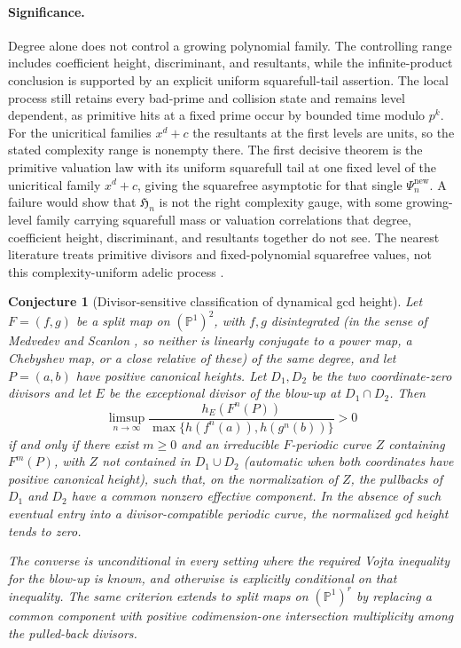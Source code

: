 \documentclass[11pt]{article}
\newtheorem{conjecture}{Conjecture}
\theoremstyle{definition}
\begin{document}
\paragraph{Significance.}
Degree alone does not control a growing polynomial family.  The controlling range includes
coefficient height, discriminant, and resultants, while the infinite-product conclusion
is supported by an explicit uniform squarefull-tail assertion.  The local process still
retains every bad-prime and collision state and remains level dependent, as primitive
hits at a fixed prime occur by bounded time modulo $p^k$.  For the unicritical families $x^d+c$ the resultants at the first levels are units, so the stated complexity range is nonempty there. The first decisive theorem is the primitive valuation law with its uniform squarefull tail at one fixed level of the unicritical family $x^d+c$, giving the squarefree asymptotic for that single $\Psi_n^{\mathrm{new}}$. A failure would show that $\mathfrak H_n$ is not the right complexity gauge, with some growing-level family carrying squarefull mass or valuation correlations that degree, coefficient height, discriminant, and resultants together do not see.  The nearest literature treats primitive divisors and fixed-polynomial squarefree values, not this complexity-uniform
adelic process \cite{Primitive,KrummDynatomic}.

\begin{conjecture}[Divisor-sensitive classification of dynamical gcd height]\label{s20}
Let $F=(f,g)$ be a split map on $(\mathbb P^1)^2$, with $f,g$ disintegrated (in the sense of Medvedev and Scanlon
\cite{MedvedevScanlon}, so neither is
linearly conjugate to a power map, a Chebyshev map, or a close relative of these) of
the same degree, and let $P=(a,b)$ have positive canonical heights.  Let $D_1,D_2$ be the two
coordinate-zero divisors and let $E$ be the exceptional divisor of the blow-up at
$D_1\cap D_2$.  Then
\[
 \limsup_{n\to\infty}
 \frac{h_E(F^n(P))}{\max\{h(f^n(a)),h(g^n(b))\}}>0
\]
if and only if there exist $m\ge0$ and an irreducible $F$-periodic curve $Z$ containing $F^m(P)$, with $Z$ not contained in $D_1\cup D_2$ (automatic when both coordinates have positive canonical height), such that, on the normalization of $Z$, the pullbacks of $D_1$ and $D_2$ have a
common nonzero effective component.  In the absence of such eventual entry into a
divisor-compatible periodic curve, the normalized gcd height tends to zero.

The converse is unconditional in every setting where the required Vojta inequality for
the blow-up is known, and otherwise is explicitly conditional on that inequality.  The
same criterion extends to split maps on $(\mathbb P^1)^r$ by replacing a common component
with positive codimension-one intersection multiplicity among the pulled-back divisors.
\end{conjecture}
\end{document}

